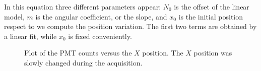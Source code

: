 In this equation three different parameters appear: $N_{0}$ is the offset of the linear model, $m$ is the angular coefficient, or the slope, and $x_{0}$ is the initial position respect to we compute the position variation. The first two terms are obtained by a linear fit, while $x_{0}$ is fixed conveniently.

\begin{figure}[hbtp]
\centering
{}
\caption{Plot of the PMT counts versus the $X$ position. The $X$ position was slowly changed during the acquisition.}
\label{fig:SlowPosition}
\end{figure}

